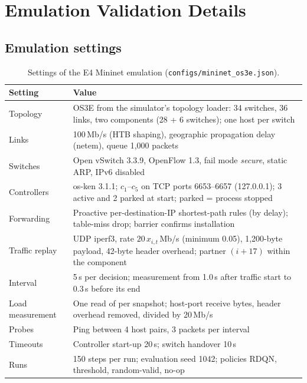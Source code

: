 \chapter{Emulation Validation Details}
\label{app:mininet}

\section{Emulation settings}

\begin{table}[H]
\centering
\caption{Settings of the E4 Mininet emulation (\texttt{configs/mininet\_os3e.json}).}
\label{tab:app-mn-settings}
\small
\begin{tabularx}{\textwidth}{@{}p{4.6cm}L@{}}
\toprule
\textbf{Setting} & \textbf{Value}\\
\midrule
Topology & OS3E from the simulator's topology loader: 34 switches, 36 links, two components (28 + 6 switches); one host per switch\\
Links & 100\,Mb/s (HTB shaping), geographic propagation delay (netem), queue 1,000 packets\\
Switches & Open vSwitch 3.3.9, OpenFlow 1.3, fail mode \emph{secure}, static ARP, IPv6 disabled\\
Controllers & os-ken 3.1.1; $c_1$--$c_5$ on TCP ports 6653--6657 (127.0.0.1); 3 active and 2 parked at start; parked = process stopped\\
Forwarding & Proactive per-destination-IP shortest-path rules (by delay); table-miss drop; barrier confirms installation\\
Traffic replay & UDP iperf3, rate $20\,x_{i,t}$\,Mb/s (minimum 0.05), 1,200-byte payload, 42-byte header overhead; partner $(i+17)$ within the component\\
Interval & 5\,s per decision; measurement from 1.0\,s after traffic start to 0.3\,s before its end\\
Load measurement & One read of  per snapshot; host-port receive bytes, header overhead removed, divided by 20\,Mb/s\\
Probes & Ping between 4 host pairs, 3 packets per interval\\
Timeouts & Controller start-up 20\,s; switch handover 10\,s\\
Runs & 150 steps per run; evaluation seed 1042; policies RDQN, threshold, random-valid, no-op\\
\bottomrule
\end{tabularx}
\end{table}

